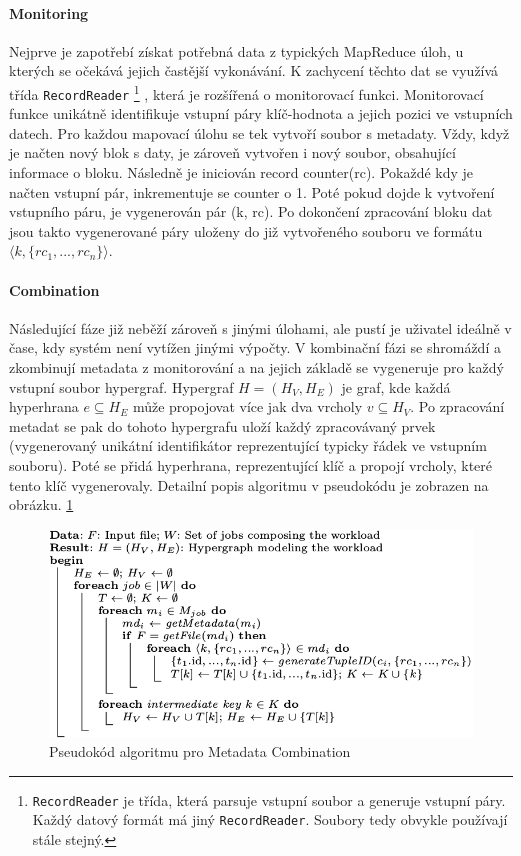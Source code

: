 \documentclass[thesis=M,czech]{FITthesis}[2012/06/26]
\begin{document}
\paragraph{Monitoring}
Nejprve je zapotřebí získat potřebná data z typických MapReduce úloh, u kterých se očekává jejich častější vykonávání. K zachycení těchto dat se využívá třída  \texttt{RecordReader} \footnote{\texttt{RecordReader} je třída, která parsuje vstupní soubor a generuje vstupní páry. Každý datový formát má jiný \texttt{RecordReader}. Soubory tedy obvykle používají stále stejný.} , která je rozšířená o  monitorovací funkci. Monitorovací funkce unikátně identifikuje vstupní páry klíč-hodnota a jejich pozici ve vstupních datech. Pro každou mapovací úlohu se tek vytvoří soubor s metadaty. Vždy, když je načten nový blok s daty, je zároveň vytvořen i nový soubor, obsahující informace o bloku. Následně je iniciován record counter(rc). Pokaždé kdy je načten vstupní pár, inkrementuje se counter o 1. Poté pokud dojde k vytvoření vstupního páru, je vygenerován pár (k, rc). Po dokončení zpracování bloku dat jsou takto vygenerované páry uloženy do již vytvořeného souboru ve formátu $\langle k,\{rc_1, ..., rc_n\}\rangle$.
\paragraph{Combination}
Následující fáze již neběží zároveň s jinými úlohami, ale pustí je uživatel ideálně v čase, kdy systém není vytížen jinými výpočty. V kombinační fázi se shromáždí a zkombinují metadata z monitorování a na jejich základě se vygeneruje pro každý vstupní soubor hypergraf. Hypergraf $H = (H_V, H_E)$ je graf, kde každá hyperhrana $e \subseteq H_E$ může propojovat více jak dva vrcholy  $v \subseteq H_V$. Po zpracování metadat se pak do tohoto hypergrafu uloží každý zpracovávaný prvek (vygenerovaný unikátní identifikátor reprezentující typicky řádek ve vstupním souboru).  Poté se přidá hyperhrana, reprezentující klíč a propojí vrcholy, které tento klíč vygenerovaly. Detailní popis algoritmu v pseudokódu je zobrazen na obrázku. \ref{fig:alg1}

\begin{figure}\centering
	\includegraphics[width=1\textwidth, angle=0]{files/alg1}
	\caption[Pseudokód algoritmu pro Metadata Combination]
	{Pseudokód algoritmu pro Metadata Combination}\label{fig:alg1}
\end{figure} 
\end{document}
